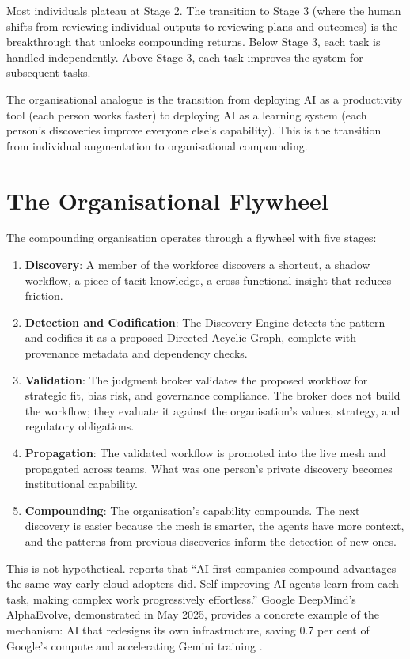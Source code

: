 Most individuals plateau at Stage 2. The transition to Stage 3 (where the human shifts from reviewing individual outputs to reviewing plans and outcomes) is the breakthrough that unlocks compounding returns. Below Stage 3, each task is handled independently. Above Stage 3, each task improves the system for subsequent tasks.

The organisational analogue is the transition from deploying AI as a productivity tool (each person works faster) to deploying AI as a learning system (each person's discoveries improve everyone else's capability). This is the transition from individual augmentation to organisational compounding.

\section{The Organisational Flywheel}

The compounding organisation operates through a flywheel with five stages:

\begin{enumerate}
  \item \textbf{Discovery}: A member of the workforce discovers a shortcut, a shadow workflow, a piece of tacit knowledge, a cross-functional insight that reduces friction.
  \item \textbf{Detection and Codification}: The Discovery Engine detects the pattern and codifies it as a proposed Directed Acyclic Graph, complete with provenance metadata and dependency checks.
  \item \textbf{Validation}: The judgment broker validates the proposed workflow for strategic fit, bias risk, and governance compliance. The broker does not build the workflow; they evaluate it against the organisation's values, strategy, and regulatory obligations.
  \item \textbf{Propagation}: The validated workflow is promoted into the live mesh and propagated across teams. What was one person's private discovery becomes institutional capability.
  \item \textbf{Compounding}: The organisation's capability compounds. The next discovery is easier because the mesh is smarter, the agents have more context, and the patterns from previous discoveries inform the detection of new ones.
\end{enumerate}

This is not hypothetical. \textcite{BCGAgenticShift2025} reports that ``AI-first companies compound advantages the same way early cloud adopters did. Self-improving AI agents learn from each task, making complex work progressively effortless.'' Google DeepMind's AlphaEvolve, demonstrated in May 2025, provides a concrete example of the mechanism: AI that redesigns its own infrastructure, saving 0.7 per cent of Google's compute and accelerating Gemini training \parencite{AlphaEvolve2025}.

